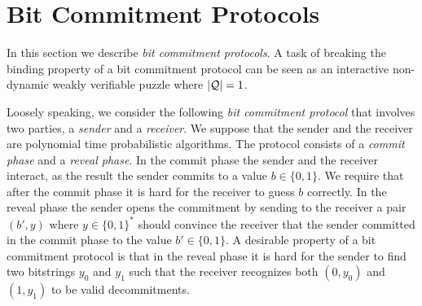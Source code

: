 \section{Bit Commitment Protocols}
\label{section:bc}
In this section we describe \textit{bit commitment protocols}. A task of breaking the binding property of
a bit commitment protocol can be seen as an interactive non-dynamic weakly verifiable puzzle where $|\mathcal{Q}| = 1$.

Loosely speaking, we consider the following \textit{bit commitment protocol} that involves two parties, a \textit{sender} and a \textit{receiver}.
We suppose that the sender and the receiver are polynomial time probabilistic algorithms.
The protocol consists of a \textit{commit phase} and a \textit{reveal phase}.
In the commit phase the sender and the receiver interact, as the result the sender commits to a value $b \in \{0,1\}$.
We require that after the commit phase it is hard for the receiver to guess $b$ correctly.
In the reveal phase the sender opens the commitment by sending to the receiver a pair $(b', y)$ where $y \in \{0,1\}^{*}$
should convince the receiver that the sender committed in the commit phase to the value $b' \in \{0,1\}$.
A desirable property of a bit commitment protocol is that in the reveal phase it is hard for
the sender to find two bitstrings $y_0$ and $y_1$ such that the receiver recognizes both $(0,y_0)$ and $(1, y_1)$ to be valid decommitments.

